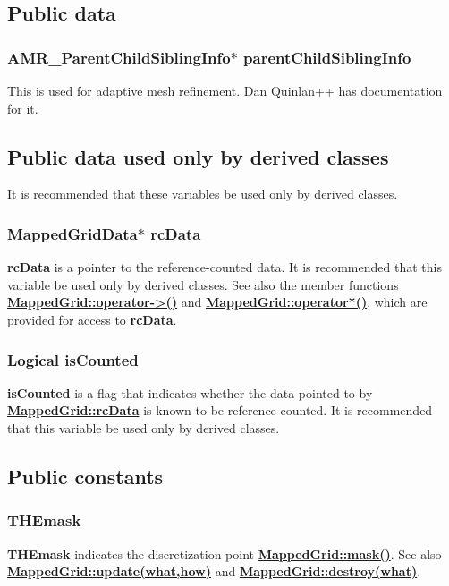 \documentclass{article}
\begin{document}
\subsection{Public data}
\label{MappedGrid::PublicData}

  \subsubsection{AMR\_ParentChildSiblingInfo$\ast$ parentChildSiblingInfo}
  \label{MappedGrid::parentChildSiblingInfo}
    This is used for adaptive mesh refinement.  Dan Quinlan++ has documentation for it.

\subsection{Public data used only by derived classes}
\label{MappedGrid::PublicDerivedClassData}

It is recommended that these variables be used only by derived classes.

  \subsubsection{MappedGridData$*$ rcData}
  \label{MappedGrid::rcData}
    \textbf{rcData} is a pointer to the reference-counted data.
    It is recommended that this variable be used only by derived classes.
    See also the member functions
    {\bf{}\hyperref{operator${-}{>}$()}{operator${-}{>}$() \rm(\S}{)}{MappedGrid::operator->()}}
    and {\bf{}\hyperref{operator$*$()}{operator$*$() \rm(\S}{)}{MappedGrid::operator*()}},
    which are provided for access to \textbf{rcData}.

  \subsubsection{Logical isCounted}
  \label{MappedGrid::isCounted}
    \textbf{isCounted} is
    a flag that indicates whether the data pointed to by {\bf{}\hyperref{rcData}{rcData \rm(\S}{)}{MappedGrid::rcData}} is known to be reference-counted.
    It is recommended that this variable be used only by derived classes.

\subsection{Public constants}
\label{MappedGrid::PublicConstants}

  \subsubsection{THEmask}
  \label{MappedGrid::THEmask}
    \textbf{THEmask} indicates the discretization point {\bf{}\hyperref{mask()}{mask() \rm(\S}{)}{MappedGrid::mask()}}.
    See also {\bf{}\hyperref{update(what,how)}{update(what,how) \rm(\S}{)}{MappedGrid::update(what,how)}}
    and {\bf{}\hyperref{destroy(what)}{destroy(what) \rm(\S}{)}{MappedGrid::destroy(what)}}.
\end{document}
